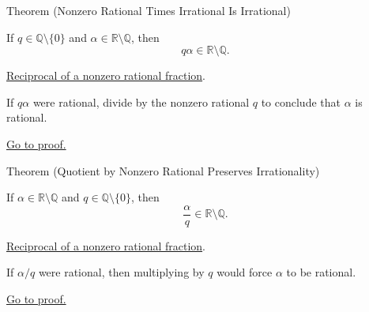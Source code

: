 \begin{theorembox}{Theorem (Nonzero Rational Times Irrational Is Irrational)}
\begin{theorem}
\label{thm:nonzero-rational-times-irrational-is-irrational}
If $q\in\mathbb{Q}\setminus\{0\}$ and $\alpha\in\mathbb{R}\setminus\mathbb{Q}$,
then
\[
q\alpha\in\mathbb{R}\setminus\mathbb{Q}.
\]
\end{theorem}
\end{theorembox}
\begin{dependencies}
\hyperref[thm:rational-fraction-reciprocal]{Reciprocal of a nonzero rational fraction}.
\end{dependencies}
\begin{remark*}
If $q\alpha$ were rational, divide by the nonzero rational $q$ to conclude that
$\alpha$ is rational.
\end{remark*}
\begin{remark*}[Proof]
\hyperref[prf:nonzero-rational-times-irrational-is-irrational]{Go to proof.}
\end{remark*}

\begin{theorembox}{Theorem (Quotient by Nonzero Rational Preserves Irrationality)}
\begin{theorem}
\label{thm:quotient-by-nonzero-rational-preserves-irrationality}
If $\alpha\in\mathbb{R}\setminus\mathbb{Q}$ and
$q\in\mathbb{Q}\setminus\{0\}$, then
\[
\frac{\alpha}{q}\in\mathbb{R}\setminus\mathbb{Q}.
\]
\end{theorem}
\end{theorembox}
\begin{dependencies}
\hyperref[thm:rational-fraction-reciprocal]{Reciprocal of a nonzero rational fraction}.
\end{dependencies}
\begin{remark*}
If $\alpha/q$ were rational, then multiplying by $q$ would force $\alpha$ to
be rational.
\end{remark*}
\begin{remark*}[Proof]
\hyperref[prf:quotient-by-nonzero-rational-preserves-irrationality]{Go to proof.}
\end{remark*}

